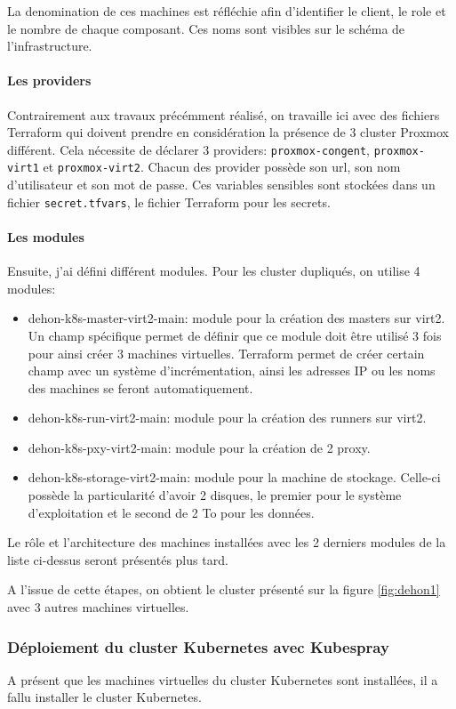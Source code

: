 \documentclass[12pt]{article}
\begin{document}
La denomination de ces machines est réfléchie afin d'identifier le client, le role et le nombre de chaque composant. 
Ces noms sont visibles sur le schéma de l'infrastructure.

\paragraph{Les providers}
Contrairement aux travaux précémment réalisé, on travaille ici avec des fichiers Terraform qui doivent prendre en considération la présence de 3 cluster Proxmox différent.
Cela nécessite de déclarer 3 providers: \verb|proxmox-congent|, \verb|proxmox-virt1| et \verb|proxmox-virt2|.
Chacun des provider possède son url, son nom d'utilisateur et son mot de passe.
Ces variables sensibles sont stockées dans un fichier \verb|secret.tfvars|, le fichier Terraform pour les secrets.

\paragraph{Les modules}
Ensuite, j'ai défini différent modules. Pour les cluster dupliqués, on utilise 4 modules:
\begin{itemize}
    \item dehon-k8s-master-virt2-main: module pour la création des masters sur virt2.
    Un champ spécifique permet de définir que ce module doit être utilisé 3 fois pour ainsi créer 3 machines virtuelles.
    Terraform permet de créer certain champ avec un système d'incrémentation, ainsi les adresses IP ou les noms des machines se feront automatiquement.
    \item dehon-k8s-run-virt2-main: module pour la création des runners sur virt2.
    \item dehon-k8s-pxy-virt2-main: module pour la création de 2 proxy.
    \item dehon-k8s-storage-virt2-main: module pour la machine de stockage.
    Celle-ci possède la particularité d'avoir 2 disques, le premier pour le système d'exploitation et le second de 2 To pour les données.
\end{itemize}

Le rôle et l'architecture des machines installées avec les 2 derniers modules de la liste ci-dessus seront présentés plus tard.

A l'issue de cette étapes, on obtient le cluster présenté sur la figure \ref{fig:dehon1} avec 3 autres machines virtuelles.

\subsubsection{Déploiement du cluster Kubernetes avec Kubespray}
A présent que les machines virtuelles du cluster Kubernetes sont installées, il a fallu installer le cluster Kubernetes.
\end{document}
